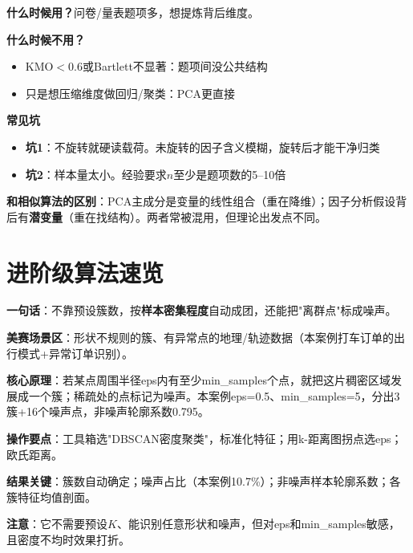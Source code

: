 \begin{algonotes}
\textbf{什么时候用？}问卷/量表题项多，想提炼背后维度。

\textbf{什么时候不用？}
\begin{itemize}
    \item KMO$<0.6$或Bartlett不显著：题项间没公共结构
    \item 只是想压缩维度做回归/聚类：PCA更直接
\end{itemize}

\textbf{常见坑}
\begin{itemize}
    \item \textbf{坑1}：不旋转就硬读载荷。未旋转的因子含义模糊，旋转后才能干净归类
    \item \textbf{坑2}：样本量太小。经验要求$n$至少是题项数的5--10倍
\end{itemize}

\textbf{和相似算法的区别}：PCA主成分是变量的线性组合（重在降维）；因子分析假设背后有\textbf{潜变量}（重在找结构）。两者常被混用，但理论出发点不同。
\end{algonotes}

\section{进阶级算法速览}


\begin{algobrief}
\textbf{一句话}：不靠预设簇数，按\textbf{样本密集程度}自动成团，还能把"离群点"标成噪声。

\textbf{美赛场景区}：形状不规则的簇、有异常点的地理/轨迹数据（本案例打车订单的出行模式+异常订单识别）。

\textbf{核心原理}：若某点周围半径eps内有至少min\_samples个点，就把这片稠密区域发展成一个簇；稀疏处的点标记为噪声。本案例eps=0.5、min\_samples=5，分出3簇+16个噪声点，非噪声轮廓系数0.795。

\textbf{操作要点}：工具箱选"DBSCAN密度聚类"，标准化特征；用k-距离图拐点选eps；欧氏距离。

\textbf{结果关键}：簇数自动确定；噪声占比（本案例10.7\%）；非噪声样本轮廓系数；各簇特征均值剖面。

\textbf{注意}：它不需要预设$K$、能识别任意形状和噪声，但对eps和min\_samples敏感，且密度不均时效果打折。
\end{algobrief}


